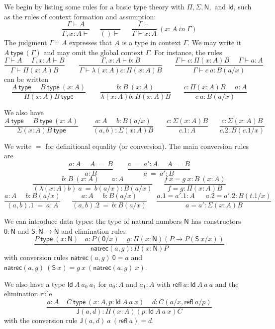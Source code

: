\documentclass[11pt,a4paper]{article}
\newcommand{\refl}{\mathsf{refl}}
\newcommand{\Id}{\mathsf{Id}}
\newcommand{\conv}{=}
\def\NN{\mathsf{N}}
\def\JJ{\mathsf{J}}
\def\ZERO{\mathsf{0}}
\def\SUCC{\mathsf{S}}
\newcommand{\type}{\mathsf{type}}
\newcommand{\N}{\mathsf{N}}
\newcommand{\natrec}{\mathsf{natrec}}
\begin{document}
We begin by listing some rules for a basic type theory with $\Pi, \Sigma, \N,$ and $\Id$, such as the rules of context formation and assumption:
$$
\frac{\Gamma\vdash A}{\Gamma,x:A\vdash}~~~~~~\frac{}{()\vdash}~~~~~~~
\frac{\Gamma\vdash}{\Gamma\vdash x:A}~(x\!:\! A~in~\Gamma)
$$
The judgment $\Gamma\vdash A$ expresses that $A$ is a type in context $\Gamma$.
We may write it $A~\type~(\Gamma)$ and may omit the global context $\Gamma$.
For instance, the rules
$$
\frac{\Gamma\vdash A~~~~~~\Gamma,x:A\vdash B}{\Gamma\vdash \Pi (x:A) B}~~~~~~~~~
\frac{\Gamma,x:A\vdash b:B}{\Gamma\vdash \lambda (x:A) c:\Pi (x:A) B}~~~~~~~~
\frac{\Gamma\vdash c:\Pi (x:A) B~~~~~~\Gamma\vdash a:A}
     {\Gamma\vdash c~a:B(a/x)}
$$
can be written
$$
\frac{A~\type~~~~~~B~\type~(x:A)}{\Pi (x:A) B~\type}~~~~~~~~~
\frac{b:B~(x:A)}{\lambda (x:A) b:\Pi (x:A) B}~~~~~~~~
\frac{c:\Pi (x:A) B~~~~~~a:A}
     {c~a:B(a/x)}
$$

We also have
$$
\frac{A~\type~~~~~~B~\type~(x:A)}{\Sigma (x:A) B~\type}~~~~~~~~~
\frac{a:A~~~~~~b:B(a/x)}{(a,b):\Sigma (x:A) B}~~~~~~~~
\frac{c:\Sigma (x:A) B}{c.1:A}~~~~~~~
\frac{c:\Sigma (x:A) B}{c.2:B(c.1/x)}
$$

We write $\conv$ for definitional equality (or conversion). The main conversion rules are
$$
\frac{ a:A~~~~~~ A~ \conv~ B}{ a:B}~~~~~~~~~
\frac{ a ~\conv~a':A~~~~~~ A  ~\conv~ B}{ a ~\conv~a':B}
$$
$$
\frac{b:B~(x:A)~~~~~~~~ a:A}{ (\lambda (x:A)b)~a  ~\conv~ b(a/x):B(a/x)}
~~~~~~~
\frac{f~x = g~x:B~(x:A)}{ f = g : \Pi (x:A)B}
$$
$$
\frac{ a:A~~~~~~ b:B(a/x)}{ (a,b).1  ~\conv~ a:A}
~~~~~~~
\frac{ a:A~~~~~~ b:B(a/x)}{ (a,b).2  ~\conv~ b:B(a/x)}~~~~~~
\frac{ a.1 = a'.1:A~~~~~~~ a.2 = a'.2:B(t.1/x)}{ a = a' : \Sigma (x:A)B}
$$

We can introduce data types: the type of natural numbers $\NN$ has
constructors $\ZERO:\NN$ and $\SUCC:\NN\rightarrow\NN$ and elimination rules
$$
\frac{P~\type~(x:\NN)~~~~a:P(\ZERO/x)~~~~~g:\Pi (x:\NN)(P\rightarrow P(\SUCC~x/x))}{\natrec(a,g):\Pi (x:\NN)P}
$$
with conversion rules $\natrec(a,g)~\ZERO = a$ and $\natrec(a,g)~(\SUCC~x) = g~x~(\natrec(a,g)~x)$.

We also have a type $\Id~A~a_0~a_1$ for $a_0:A$ and $a_1:A$ with $\refl~a:\Id~A~a~a$
and the elimination rule
$$\frac{a:A~~~~~C~\type~(x:A,p:\Id~A~a~x)~~~~~d:C(a/x,\refl~a/p)}{\JJ (a,d):\Pi (x:A)(p:\Id~A~a~x)C}$$
with the conversion rule $\JJ(a,d)~a~(\refl~a) = d$.
\end{document}

